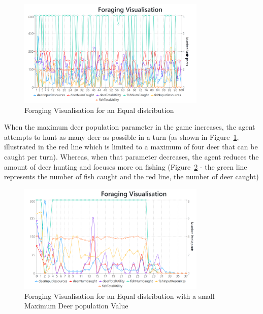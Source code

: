 \begin{figure}[!htb]
    \centering
    \includegraphics[width=0.8\textwidth]{13_team5_agentdesign/images/Foraging Simulation MaxDeerpop_Equal.PNG}
    \caption{Foraging Visualisation for an Equal distribution}
    \label{fig:Foraging Simulation MaxDeerpop_Equal}
\end{figure}

\newpage
When the maximum deer population parameter in the game increases, the agent attempts to hunt as many deer as possible in a turn (as shown in Figure~\ref{fig:Foraging Simulation MaxDeerpop_Equal}, illustrated in the red line which is limited to a maximum of four deer that can be caught per turn). Whereas, when that parameter decreases, the agent reduces the amount of deer hunting and focuses more on fishing (Figure~\ref{fig:Foraging Simulation MaxDeerpop_Equal_decrease} - the green line represents the number of fish caught and the red line, the number of deer caught)

\begin{figure}[!htb]
    \centering
    \includegraphics[width=0.8\textwidth]{13_team5_agentdesign/images/Foraging Simulation MaxDeerpop_Equal_decrease.PNG}
    \caption{Foraging Visualisation for an Equal distribution with a small Maximum Deer population Value}
    \label{fig:Foraging Simulation MaxDeerpop_Equal_decrease}
\end{figure}

